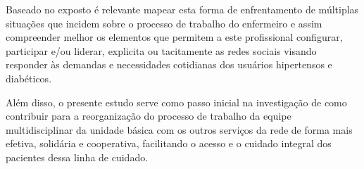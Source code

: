 Baseado  no exposto é relevante mapear esta forma de enfrentamento de múltiplas situações que incidem sobre o processo de trabalho do enfermeiro e assim compreender melhor os elementos que permitem a este profissional configurar, participar e/ou liderar, explicita ou tacitamente as redes sociais visando responder às demandas e necessidades cotidianas dos usuários hipertensos e diabéticos. 

Além disso, o presente estudo serve como passo inicial na investigação de como contribuir para a reorganização do processo de trabalho da equipe multidisciplinar da unidade  básica com os outros serviços da rede de forma mais  efetiva, solidária e cooperativa, facilitando o acesso e o cuidado integral dos pacientes dessa linha de cuidado.